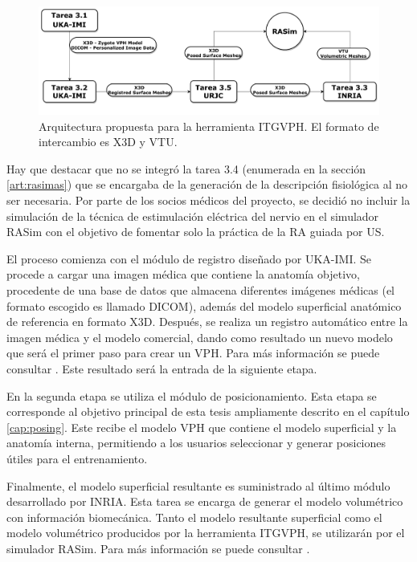 \begin{figure}
    \centering
    \includegraphics[width=1\textwidth]{IMG/DiagramaITGVPH.pdf}
    \caption{Arquitectura propuesta para la herramienta \acs{ITGVPH}. El formato de intercambio es \acs{X3D} y \acs{VTU}.}
    \label{fig:toolarq}
\end{figure}

Hay que destacar que no se integró  la tarea 3.4 (enumerada en la sección \ref{art:rasimas}) que se encargaba de la generación de la descripción fisiológica al no ser necesaria. Por parte de los socios médicos del proyecto, se decidió no incluir la simulación de la técnica de estimulación eléctrica del nervio en el simulador \ac{RASim} con el objetivo de  fomentar solo la práctica de la \ac{RA} guiada por \ac{US}.

El proceso comienza con el módulo de registro diseñado por \ac{UKA-IMI}. Se procede a cargar una imagen médica que contiene la anatomía objetivo, procedente de una base de datos que almacena diferentes imágenes médicas (el formato escogido es llamado \acs{DICOM}), además del modelo superficial anatómico de referencia en formato \ac{X3D}. Después, se realiza un registro automático entre la imagen médica y el modelo comercial, dando como resultado un nuevo modelo que será el primer paso para crear un \ac{VPH}. Para más información se puede consultar \cite{deOliveira:2015}. Este resultado será la entrada de la siguiente etapa.

En la segunda etapa se utiliza el módulo de posicionamiento. Esta etapa se corresponde al objetivo principal de esta tesis ampliamente descrito en el capítulo \ref{cap:posing}. Este recibe el modelo \ac{VPH} que contiene el modelo superficial y la anatomía interna, permitiendo a los usuarios seleccionar y generar posiciones útiles para el entrenamiento.

Finalmente, el modelo superficial resultante es suministrado al último módulo desarrollado por \ac{INRIA}. Esta tarea se encarga de generar el modelo volumétrico con  información biomecánica.
Tanto el modelo resultante superficial como el modelo volumétrico producidos por la herramienta \ac{ITGVPH}, se utilizarán por el simulador \ac{RASim}. Para más información se puede consultar \cite{ded3.3}.



